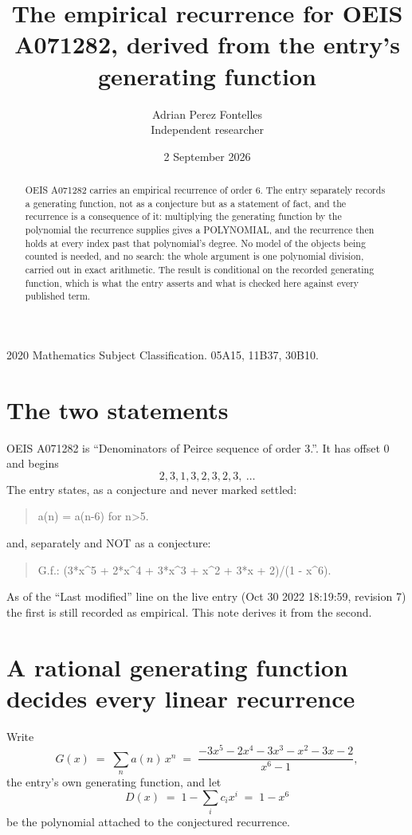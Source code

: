 \documentclass[11pt,a4paper]{article}
\title{The empirical recurrence for OEIS A071282, derived from the entry's generating function}
\author{Adrian Perez Fontelles\\ \small Independent researcher}
\date{2 September 2026}
\theoremstyle{plain}
\theoremstyle{definition}
\begin{document}
\maketitle

\begin{abstract}
OEIS A071282 carries an empirical recurrence of order $6$. The entry separately records a
generating function, not as a conjecture but as a statement of fact, and the recurrence is a
consequence of it: multiplying the generating function by the polynomial the recurrence
supplies gives a POLYNOMIAL, and the recurrence then holds at every index past that
polynomial's degree. No model of the objects being counted is needed, and no search: the
whole argument is one polynomial division, carried out in exact arithmetic. The result is
conditional on the recorded generating function, which is what the entry asserts and what is
checked here against every published term.
\end{abstract}

\noindent\small 2020 Mathematics Subject Classification. 05A15, 11B37, 30B10.\normalsize

\section{The two statements}

OEIS A071282 is ``Denominators of Peirce sequence of order 3.''. It has offset $0$ and begins
\[
2, 3, 1, 3, 2, 3, 2, 3,\ \dots
\]
The entry states, as a conjecture and never marked settled:
\begin{quote}
a(n) = a(n-6) for n>5.
\end{quote}
and, separately and NOT as a conjecture:
\begin{quote}
G.f.: (3*x\^{}5 + 2*x\^{}4 + 3*x\^{}3 + x\^{}2 + 3*x + 2)/(1 - x\^{}6).
\end{quote}
As of the ``Last modified'' line on the live entry (Oct 30 2022 18:19:59, revision 7) the first is still
recorded as empirical. This note derives it from the second.

\section{A rational generating function decides every linear recurrence}

Write
\[
G(x)\;=\;\sum_{n}a(n)\,x^{n}\;=\;\frac{- 3 x^{5} - 2 x^{4} - 3 x^{3} - x^{2} - 3 x - 2}{x^{6} - 1},
\]
the entry's own generating function, and let
\[
D(x)\;=\;1-\sum_i c_i x^{i}\;=\;1 - x^{6}
\]
be the polynomial attached to the conjectured recurrence.
\end{document}
